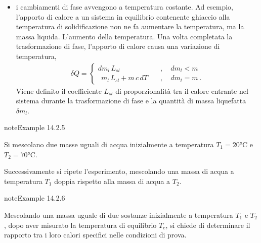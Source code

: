 \documentclass[letterpaper,10pt,italian]{jupyterBook}
\begin{document}
\begin{itemize}
\item {} 
\sphinxAtStartPar
i cambiamenti di fase avvengono a temperatura costante. Ad esempio, l’apporto di calore a un sistema in equilibrio contenente ghiaccio alla temperatura di solidificazione non ne fa aumentare la temperatura, ma la massa liquida. L’aumento della temperatura. Una volta completata la trasformazione di fase, l’apporto di calore causa una variazione di temperatura,
\begin{equation*}
\begin{split}\delta Q = \begin{cases}
      d m_{l} \, L_{sl}                 \quad & , \quad {d m_l < m} \\
    \ \ m_{l} \, L_{sl} + m \, c \, d T \quad & , \quad {d m_l = m} \ .
    \end{cases}\end{split}
\end{equation*}
\sphinxAtStartPar
Viene definito  il coefficiente \(L_{sl}\) di proporzionalità tra il calore entrante nel sistema durante la trasformazione di fase e la quantità di massa liquefatta \(\delta m_l\).

\end{itemize}
\label{ch/thermodynamics/foundation-experiments:thermodynamics:history:heat-capacity:1}
\begin{sphinxadmonition}{note}{Example 14.2.5}



\sphinxAtStartPar
Si mescolano due masse uguali di acqua inizialmente a temperatura \(T_1 = 20 \text{°C}\) e \(T_2 = 70 \text{°C}\).

\sphinxAtStartPar
Successivamente si ripete l’esperimento, mescolando una massa di acqua a temperatura \(T_1\) doppia rispetto alla massa di acqua a \(T_2\).
\end{sphinxadmonition}
\label{ch/thermodynamics/foundation-experiments:thermodynamics:history:heat-capacity:2}
\begin{sphinxadmonition}{note}{Example 14.2.6}



\sphinxAtStartPar
Mescolando una massa uguale di due sostanze inizialmente a temperatura \(T_1\)  e \(T_2\), dopo aver misurato la temperatura di equilibrio \(T_e\), si chiede di determinare il rapporto tra i loro calori specifici nelle condizioni di prova.
\end{sphinxadmonition}
\label{ch/thermodynamics/foundation-experiments:thermodynamics:history:heat-capacity:3}
\end{document}
